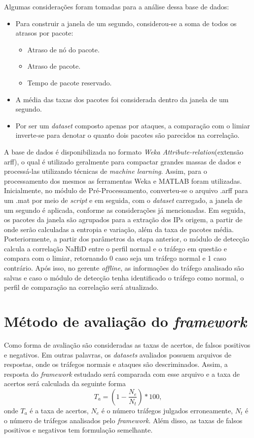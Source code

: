 Algumas considerações foram tomadas para a análise dessa base de dados:
\begin{itemize}
	\item Para construir a janela de um segundo, considerou-se a soma de todos os atrasos por pacote:
	\begin{itemize}
	 \item Atraso de nó do pacote.
	 \item  Atraso de pacote.
	 \item Tempo de pacote reservado.
	\end{itemize}
	\item A média das taxas dos pacotes foi considerada dentro da janela de um segundo.
	\item Por ser um \textit{dataset} composto apenas por ataques, a comparação com o limiar inverte-se para denotar o quanto dois pacotes são parecidos na correlação.
\end{itemize}

A base de dados é disponibilizada no formato \textit{Weka Attribute-relation}(extensão arff), o qual é utilizado geralmente para compactar grandes massas de dados e processá-las utilizando técnicas de \textit{machine learning}. Assim, para o processamento dos mesmos as ferramentas Weka e MATLAB foram utilizadas. Inicialmente, no módulo de Pré-Processamento, converteu-se o arquivo .arff para um .mat por meio de \textit{script} e em seguida, com o \textit{dataset} carregado, a janela de um segundo é aplicada, conforme as considerações já mencionadas. Em seguida, os pacotes da janela são agrupados para a extração dos IPs origem, a partir de onde serão calculadas a entropia e  variação, além da taxa de pacotes média. Posteriormente, a partir dos parâmetros da etapa anterior, o módulo de detecção calcula a correlação NaHiD entre o perfil normal e o tráfego em questão e compara com o limiar, retornando 0 caso seja um tráfego normal e 1 caso contrário. Após isso, no gerente \textit{offline}, as informações do tráfego analisado são salvas e caso o módulo de detecção tenha identificado o tráfego como normal, o perfil de comparação na correlação será atualizado.
\section{Método de avaliação do \textit{framework}}
Como forma de avaliação são consideradas as taxas de acertos, de falsos positivos e negativos. Em outras palavras, os \textit{datasets} avaliados possuem arquivos de respostas, onde os tráfegos normais e ataques são descriminados. Assim, a resposta do \textit{framework} estudado será comparada com esse arquivo e a taxa de acertos será calculada da seguinte forma
\begin{equation}
T_a = \left(1 - \frac{N_e}{N_t}\right)* 100,
\end{equation}
onde $T_a$ é a taxa de acertos, $N_e$ é o número tráfegos julgados erroneamente, $N_t$ é o número de tráfegos analisados pelo \textit{framework}. Além disso, as taxas de falsos positivos e negativos tem formulação semelhante.